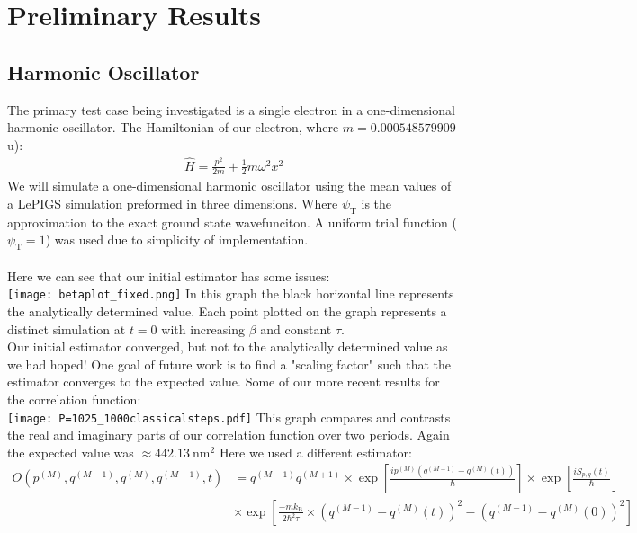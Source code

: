 \documentclass[12pt,letterpaper,oneside,final,titlepage]{article}               %
\numberwithin{equation}{section} %
\newcommand{\psiT}{\psi_{\textrm{T}}}
\newcommand{\expb}[1]{\ensuremath{\exp{\left[ #1 \right]}}}
\begin{document}
\section{Preliminary Results}

\subsection*{Harmonic Oscillator}
The primary test case being investigated is a single electron in a one-dimensional harmonic oscillator. 
The Hamiltonian of our electron, where $m = \num{0.000548579909}$u): 
\begin{align}
    \hat{H} = \frac{p^2}{2m} + \frac{1}{2} m \omega^{2} x^{2} 
\end{align}
We will simulate a one-dimensional harmonic oscillator using the mean values of a LePIGS simulation preformed in three dimensions. 
Where $\psiT$ is the approximation to the exact ground state wavefunciton. 
A uniform trial function ($\psiT = 1$) was used due to simplicity of implementation. \\ \\
Here we can see that our initial estimator has some issues:\\
\texttt{[image: betaplot\_fixed.png]}
In this graph the black horizontal line represents the analytically determined value.
Each point plotted on the graph represents a distinct simulation at $t=0$ with increasing $\beta$ and constant $\tau$.\\
Our initial estimator converged, but not to the analytically determined value as we had hoped! 
One goal of future work is to find a "scaling factor" such that the estimator converges to the expected value.
Some of our more recent results for the correlation function:\\
\texttt{[image: P=1025\_1000classicalsteps.pdf]}
This graph compares and contrasts the real and imaginary parts of our correlation function over two periods. 
Again the expected value was $\approx 442.13~\textrm{nm}^2$
Here we used a different estimator:
\newcommand{\bead}[1]{^{(#1)}}
\newcommand{\kB}{k_\textrm{B}}
\begin{align*}
    O(p\bead{M}, q\bead{M-1}, q\bead{M}, q\bead{M+1}, t) 
        &= q\bead{M-1} q\bead{M+1}
        \times\expb{\frac{ip\bead{M}(q\bead{M-1} - q\bead{M}(t))}{\hbar}} 
        \times\expb{\frac{iS_{p,q}(t)}{\hbar}}
    \\  &\times\expb{\frac{-m\kB}{2\hbar^{2}\tau} \times(q\bead{M-1} - q\bead{M}(t))^{2} - (q\bead{M-1} - q\bead{M}(0))^{2}}
\end{align*} 
\end{document}
